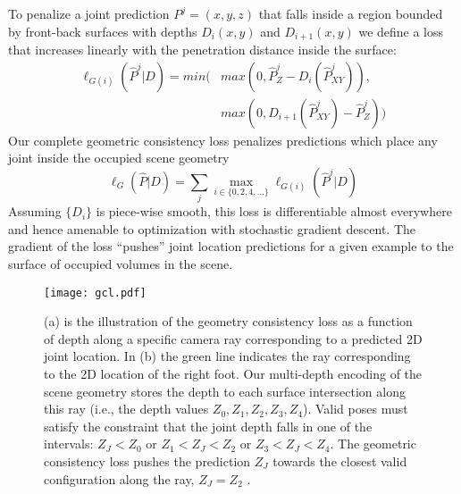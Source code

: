 \documentclass[times,referee,twocolumn,final,authoryear]{elsarticle}
\begin{document}
To penalize a joint prediction $P^j=(x,y,z)$ that falls inside a region bounded by
front-back surfaces with depths $D_i(x,y)$ and $D_{i+1}(x,y)$ we define a loss that
increases linearly with the penetration distance inside the surface:
\begin{equation}
\begin{aligned}
  \ell_{G(i)}({\hat P}^j|D)  =  min( 
  &max(0, {\hat P}^j_Z - D_i({\hat P}^j_{XY})),\\
  &max(0, D_{i+1}({\hat P}^j_{XY}) - {\hat P}^j_Z ))
  \end{aligned}
\end{equation}
Our complete geometric consistency loss penalizes predictions which place 
any joint inside the occupied scene geometry
\begin{equation}
  \ell_{G}({\hat P}|D)  =  \sum_j \max_{i \in \{0,2,4,\ldots\}} \ell_{G(i)}({\hat P}^j|D)
  \label{eqn:lg}
\end{equation}
Assuming $\{D_i\}$ is piece-wise smooth, this loss is differentiable almost
everywhere and hence amenable to optimization with stochastic gradient descent. 
The gradient of the loss ``pushes'' joint location predictions for a given example 
to the surface of occupied volumes in the scene.

\begin{figure}[t]
\begin{center}
\texttt{[image: gcl.pdf]}
\end{center}
   \caption{(a) is the illustration of the geometry consistency loss as a function of
   depth along a specific camera ray corresponding to a predicted 2D joint
   location.  In (b) the green line indicates the ray corresponding to the 2D
   location of the right foot. Our multi-depth encoding of the scene geometry
   stores the depth to each surface intersection along this ray (i.e., the
   depth values $Z_0, Z_1, Z_2, Z_3, Z_4$). Valid poses must satisfy the constraint
   that the joint depth falls in one of the intervals: $ Z_J < Z_0 $  or $ Z_1 <
   Z_J < Z_2 $ or $ Z_3 < Z_J < Z_4 $. The geometric consistency loss pushes the
   prediction $Z_J$ towards the closest valid configuration along the ray, $Z_J = Z_2$ .}
\label{fig:constraint}
\end{figure}
\end{document}
